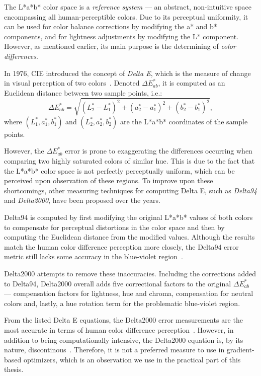 The L*a*b* color space is a \emph{reference system} --- an abstract, non-intuitive space encompassing all human-perceptible colors. Due to its perceptual uniformity, it can be used for color balance corrections by modifying the a* and b* components, and for lightness adjustments by modifying the L* component. However, as mentioned earlier, its main purpose is the determining of \emph{color differences}.

In 1976, CIE introduced the concept of \emph{Delta E}, which is the measure of change in visual perception of two colors~\cite{deltaEOverview}. Denoted $\Delta E_{ab}^*$, it is computed as an Euclidean distance between two sample points, i.e.:
\begin{equation} \label{deltaE}
\Delta E_{ab}^*=\sqrt{(L_{2}^* - L_{1}^*)^2 + (a_{2}^* - a_{1}^*)^2 + (b_{2}^* - b_{1}^*)^2},
\end{equation}
where $(L_{1}^*,a_{1}^*,b_{1}^*)$ and $(L_{2}^*,a_{2}^*,b_{2}^*)$ are the L*a*b* coordinates of the sample points.

However, the $\Delta E_{ab}^*$ error is prone to exaggerating the differences occurring when comparing two highly saturated colors of similar hue. This is due to the fact that the L*a*b* color space is not perfectly perceptually uniform, which can be perceived upon observation of these regions. To improve upon these shortcomings, other measuring techniques for computing Delta E, such as \emph{Delta94} and \emph{Delta2000}, have been proposed over the years.

Delta94 is computed by first modifying the original L*a*b* values of both colors to compensate for perceptual distortions in the color space and then by computing the Euclidean distance from the modified values. Although the results match the human color difference perception more closely, the Delta94 error metric still lacks some accuracy in the blue-violet region~\cite{deltaEOverview}.
	
Delta2000 attempts to remove these inaccuracies. Including the corrections added to Delta94, Delta2000 overall adds five correctional factors to the original $\Delta E_{ab}^*$ --- compensation factors for lightness, hue and chroma, compensation for neutral colors and, lastly, a hue rotation term for the problematic blue-violet region.

From the listed Delta E equations, the Delta2000 error measurements are the most accurate in terms of human color difference perception~\cite{deltaEOverview}. However, in addition to being computationally intensive, the Delta2000 equation is, by its nature, discontinous~\cite{delta2000Discontinuities}. Therefore, it is not a preferred measure to use in gradient-based optimizers, which is an observation we use in the practical part of this thesis.

